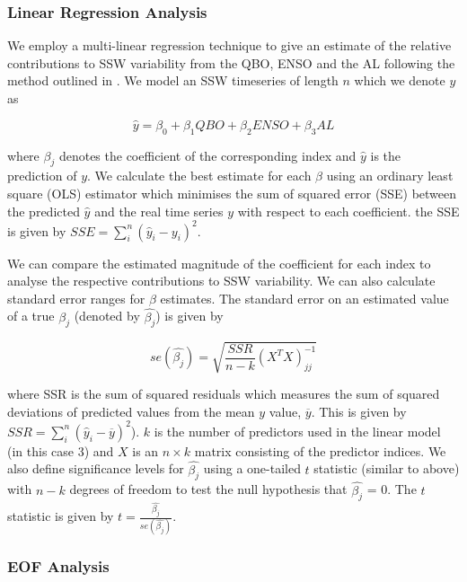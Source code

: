 \subsubsection*{Linear Regression Analysis}
We employ a multi-linear regression technique to give an estimate of the relative contributions to SSW variability from the QBO, ENSO and the AL following the method outlined in \cite{Krzywinski}. We model an SSW timeseries of length $n$ which we denote $y$ as 

\begin{equation} \label{regression}
\hat{y} = \beta_0 + \beta_{1}QBO + \beta_{2}ENSO + \beta_{3}AL
\end{equation}

where $\beta_j$ denotes the coefficient of the corresponding index and $\hat{y}$ is the prediction of $y$. We calculate the best estimate for each $\beta$ using an ordinary least square (OLS) estimator which minimises the sum of squared error (SSE) between the predicted $\hat{y}$ and the real time series $y$ with respect to each coefficient. the SSE is given by $SSE = \sum_i^n{(\hat{y}_i - y_i)^2}$.

We can compare the estimated magnitude of the coefficient for each index to analyse the respective contributions to SSW variability. We can also calculate standard error ranges for $\beta$ estimates. The standard error on an estimated value of a true $\beta_j$ (denoted by $\hat{\beta_j}$) is given by 

\begin{equation} \label{regression}
se(\hat{\beta_j}) = \sqrt{\frac{SSR}{n - k} (X^TX)^{-1}_{jj}}
\end{equation}

where SSR is the sum of squared residuals which measures the sum of squared deviations of predicted values from the mean $y$ value, $\overline{y}$. This is given by $SSR = \sum_i^n{(\hat{y}_i - \overline{y})^2}$). $k$ is the number of predictors used in the linear model (in this case 3) and $X$ is an $n \times k$ matrix consisting of the predictor indices. We also define significance levels for $\hat{\beta_j}$ using a one-tailed $t$ statistic (similar to above) with $n-k$ degrees of freedom to test the null hypothesis that $\hat{\beta_j}$ = 0. The $t$ statistic is given by $t = \frac{\hat{\beta_j}}{se(\hat{\beta_j})}$.

\subsubsection*{EOF Analysis}

